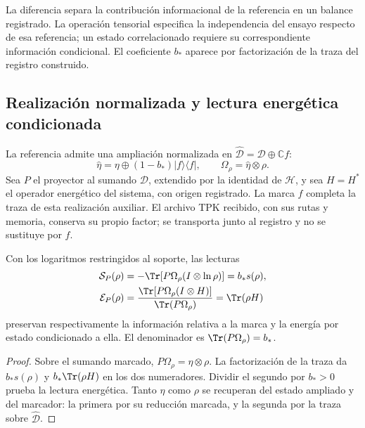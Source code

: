 La diferencia separa la contribución informacional de la referencia en
un balance registrado. La operación tensorial especifica la independencia
del ensayo respecto de esa referencia; un estado correlacionado requiere
su correspondiente información condicional. El coeficiente $b_*$ aparece
por factorización de la traza del registro construido.

\subsection{Realización normalizada y lectura energética condicionada}
\label{subsec:ii-ter27-flag}

La referencia admite una ampliación normalizada en
$\widehat{\mathcal D}=\mathcal D\oplus\mathbb C f$:
\begin{equation}
 \widehat\eta=\eta\oplus(1-b_*)|f\rangle\langle f|,
 \qquad \Omega_\rho=\widehat\eta\otimes\rho.
 \label{eq:ii-ter27-flag}
\end{equation}
Sea $P$ el proyector al sumando $\mathcal D$, extendido por la identidad
de $\mathcal H$, y sea $H=H^*$ el operador energético del sistema,
con origen registrado. La marca $f$ completa la traza de esta realización
auxiliar. El archivo TPK recibido, con sus rutas y memoria, conserva su
propio factor; se transporta junto al registro y no se sustituye por $f$.

\begin{proposition}
\label{prop:ii-ter27-readers}
Con los logaritmos restringidos al soporte, las lecturas
\begin{align}
 \mathcal S_P(\rho)&=-\Tr[P\Omega_\rho(I\otimes\ln\rho)]
                    =b_*s(\rho),\label{eq:ii-ter27-S}\\
 \mathcal E_P(\rho)&=
 \frac{\Tr[P\Omega_\rho(I\otimes H)]}{\Tr(P\Omega_\rho)}
                    =\Tr(\rho H)\label{eq:ii-ter27-E}
\end{align}
preservan respectivamente la información relativa a la marca y la energía
por estado condicionado a ella. El denominador es $\Tr(P\Omega_\rho)=b_*$.
\end{proposition}
\begin{proof}
Sobre el sumando marcado, $P\Omega_\rho=\eta\otimes\rho$.
La factorización de la traza da $b_*s(\rho)$ y
$b_*\Tr(\rho H)$ en los dos numeradores. Dividir el segundo por
$b_*>0$ prueba la lectura energética. Tanto $\eta$ como $\rho$ se
recuperan del estado ampliado y del marcador: la primera por su reducción
marcada, y la segunda por la traza sobre $\widehat{\mathcal D}$.
\end{proof}

